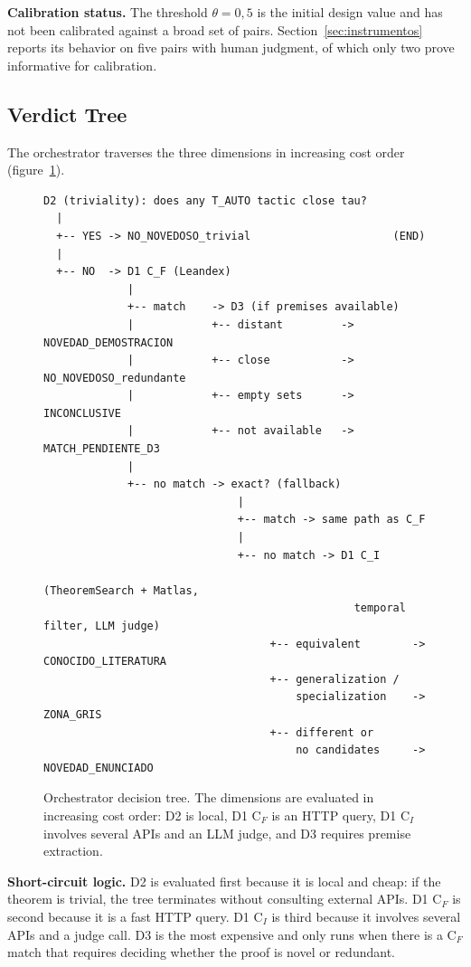 \documentclass[12pt,a4paper]{article}
\theoremstyle{remark}
\begin{document}
\textbf{Calibration status.} The threshold $\theta = 0{,}5$ is the initial design value and has not been calibrated against a broad set of pairs. Section~\ref{sec:instrumentos} reports its behavior on five pairs with human judgment, of which only two prove informative for calibration.

\subsection{Verdict Tree}

The orchestrator traverses the three dimensions in increasing cost order (figure~\ref{fig:arbol}).

\begin{figure}[htbp]
\centering
\small
\begin{verbatim}
D2 (triviality): does any T_AUTO tactic close tau?
  |
  +-- YES -> NO_NOVEDOSO_trivial                      (END)
  |
  +-- NO  -> D1 C_F (Leandex)
             |
             +-- match    -> D3 (if premises available)
             |            +-- distant         -> NOVEDAD_DEMOSTRACION
             |            +-- close           -> NO_NOVEDOSO_redundante
             |            +-- empty sets      -> INCONCLUSIVE
             |            +-- not available   -> MATCH_PENDIENTE_D3
             |
             +-- no match -> exact? (fallback)
                              |
                              +-- match -> same path as C_F
                              |
                              +-- no match -> D1 C_I
                                               (TheoremSearch + Matlas,
                                                temporal filter, LLM judge)
                                   +-- equivalent        -> CONOCIDO_LITERATURA
                                   +-- generalization /
                                       specialization    -> ZONA_GRIS
                                   +-- different or
                                       no candidates     -> NOVEDAD_ENUNCIADO
\end{verbatim}
\caption{Orchestrator decision tree. The dimensions are evaluated in increasing cost order: D2 is local, D1 C$_F$ is an HTTP query, D1 C$_I$ involves several APIs and an LLM judge, and D3 requires premise extraction.}
\label{fig:arbol}
\end{figure}

\textbf{Short-circuit logic.} D2 is evaluated first because it is local and cheap: if the theorem is trivial, the tree terminates without consulting external APIs. D1 C$_F$ is second because it is a fast HTTP query. D1 C$_I$ is third because it involves several APIs and a judge call. D3 is the most expensive and only runs when there is a C$_F$ match that requires deciding whether the proof is novel or redundant.
\end{document}
